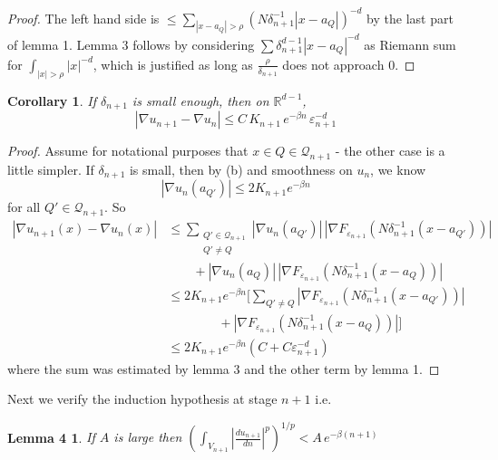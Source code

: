 \documentclass[11pt,reqno]{amsart}
\newtheorem*{lemD}{Lemma 4}
\newtheorem*{cor}{Corollary}
\newcommand{\Rdm}{\mathbb{R}^{d-1}}
\newcommand{\dn}[1]{\frac{d#1}{dn}}
\begin{document}
\begin{proof}
The left hand side is
$\leq\sum_{|x-a_Q|>\rho}\left(N\delta_{n+1}^{-1}|x-a_Q|\right)^{-d}$
by the last part of lemma 1.  Lemma 3 follows by considering
$\sum\delta_{n+1}^{d-1}|x-a_Q|^{-d}$ as Riemann sum for
$\int_{|x|>\rho}|x|^{-d}$, which is justified as long as
$\frac{\rho}{\delta_{n+1}}$ does not approach $0$.
\end{proof}

\begin{cor}
If $\delta_{n+1}$ is small enough, then on $\Rdm$,
\begin{equation*}
 |\nabla u_{n+1}-\nabla u_n|\leq C\,K_{n+1}\,e^{-\beta n}\,\varepsilon_{n+1}^{-d}
\end{equation*}
\end{cor}

\begin{proof}
Assume for notational purposes that $x\in Q\in\mathcal{Q}_{n+1}$ - the other case
is a little simpler.  If $\delta_{n+1}$ is small, then by (b) and smoothness on
$u_n$, we know
\begin{equation*}
 |\nabla u_n(a_{Q'})|\leq 2K_{n+1}e^{-\beta n}
\end{equation*}
for all $Q'\in\mathcal{Q}_{n+1}$.  So
\begin{align*}
 |\nabla u_{n+1}(x)-\nabla u_n(x)|
 &\leq\sum_{\substack{Q'\in\mathcal{Q}_{n+1}\\ Q'\neq Q}}
   |\nabla u_n(a_{Q'})|\,
   \left|\nabla F_{\varepsilon_{n+1}}(N\delta_{n+1}^{-1}(x-a_{Q'}))\right|\\
 &\qquad+|\nabla u_n(a_Q)|\,
   \left|\nabla F_{\varepsilon_{n+1}}(N\delta_{n+1}^{-1}(x-a_Q))\right|\\
 &\leq 2K_{n+1}e^{-\beta n}\Big[\sum_{Q'\neq Q}
   \left|\nabla F_{\varepsilon_{n+1}}(N\delta_{n+1}^{-1}(x-a_{Q'}))\right|\\
 &\qquad\qquad+\left|\nabla F_{\varepsilon_{n+1}}(N\delta_{n+1}^{-1}(x-a_Q))\right|\Big]\\
 &\leq 2K_{n+1}e^{-\beta n}\left(C+C\varepsilon_{n+1}^{-d}\right)
\end{align*}
where the sum was estimated by lemma 3 and the other term by lemma 1.
\end{proof}

Next we verify the induction hypothesis at stage $n+1$ i.e.

\begin{lemD}
If $A$ is large then
$\displaystyle\left(\int_{V_{n+1}}\left|\dn{u_{n+1}}\right|^{p}\right)^{1/p}
 < A\,e^{-\beta(n+1)}$
\end{lemD}
\end{document}
